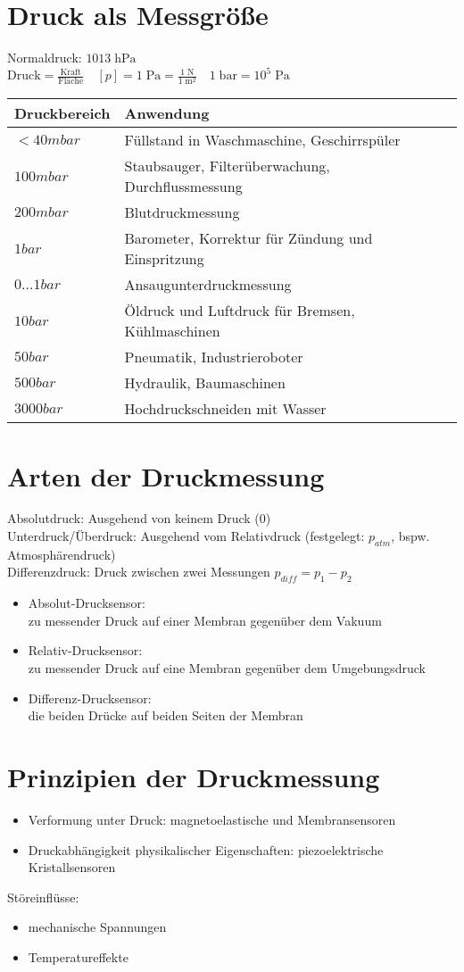 \section{Druck als Messgröße}
Normaldruck: $1013\;\mathrm{hPa}$\\
$\text{Druck}=\frac{\text{Kraft}}{\text{Fläche}} \quad [p]=1\;\mathrm{Pa}=\frac{1 \;\mathrm{N}}{1 \;\mathrm{m^2}} \quad 1 \;\mathrm{bar} = 10^5 \;\mathrm{Pa}$\\
\begin{tabular}{l | l}
Druckbereich & Anwendung\\\hline
$<40 \unit{mbar}$ & Füllstand in Waschmaschine, Geschirrspüler\\
$100\unit{mbar}$ & Staubsauger, Filterüberwachung, Durchflussmessung\\
$200\unit{mbar}$ & Blutdruckmessung\\
$1\unit{bar}$ & Barometer, Korrektur für Zündung und Einspritzung\\
$0\dots 1 \unit{bar}$ & Ansaugunterdruckmessung\\
$10\unit{bar}$ & Öldruck und Luftdruck für Bremsen, Kühlmaschinen\\
$50 \unit{bar}$ & Pneumatik, Industrieroboter\\
$500 \unit{bar}$ & Hydraulik, Baumaschinen\\
$3000 \unit{bar}$ & Hochdruckschneiden mit Wasser
\end{tabular}
\section{Arten der Druckmessung}
Absolutdruck: Ausgehend von keinem Druck ($0$)\\
Unterdruck/Überdruck: Ausgehend vom Relativdruck (festgelegt: $p_{atm}$, bspw. Atmosphärendruck)\\
Differenzdruck: Druck zwischen zwei Messungen $p_{diff}=p_1-p_2$
\begin{itemize}
\item Absolut-Drucksensor:\\
zu messender Druck auf einer Membran gegenüber dem Vakuum
\item Relativ-Drucksensor:\\
zu messender Druck auf eine Membran gegenüber dem Umgebungsdruck
\item Differenz-Drucksensor:\\
die beiden Drücke auf beiden Seiten der Membran
\end{itemize}
\section{Prinzipien der Druckmessung}
\begin{itemize}
\item Verformung unter Druck: magnetoelastische und Membransensoren
\item Druckabhängigkeit physikalischer Eigenschaften: piezoelektrische Kristallsensoren
\end{itemize}
Störeinflüsse:
\begin{itemize}
\item mechanische Spannungen
\item Temperatureffekte
\end{itemize}
